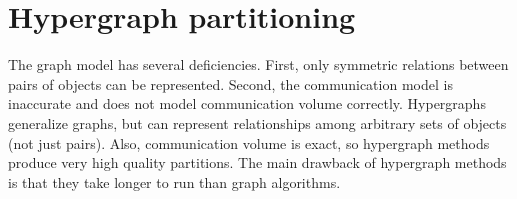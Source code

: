 \section{Hypergraph partitioning}
The graph model has several deficiencies. First, only symmetric
relations between pairs of objects can be represented. Second, 
the communication model is inaccurate and does not model 
communication volume correctly.
Hypergraphs generalize graphs, but can represent relationships
among arbitrary sets of objects (not just pairs). Also,
communication volume is exact, so hypergraph methods 
produce very high quality partitions. The main drawback of hypergraph
methods is that they take longer to run than graph algorithms. 

